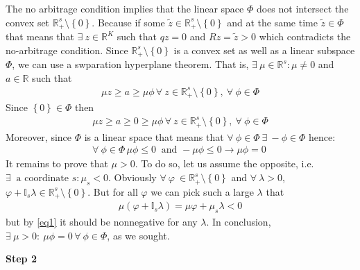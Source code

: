 \documentclass[a4paper]{article}
\begin{document}
The no arbitrage condition implies that the linear space $\Phi$ does not intersect the convex set $\mathbb{R}^s_+\setminus\left\{0\right\}$. Because if some $\tilde{z} \in \mathbb{R}^s_+\setminus\left\{0\right\}$ and at the same time $\tilde{z} \in \Phi$ that means that $\exists\ z\in \mathbb{R}^K$ such that $qz = 0$ and $Rz = \tilde{z} > 0$ which contradicts the no-arbitrage condition. Since $\mathbb{R}^s_+\setminus\left\{0\right\}$ is a convex set as well as a linear subspace $\Phi$, we can use a swparation hyperplane theorem. That is, $\exists\ \mu \in \mathbb{R}^s: \mu \neq 0$ and $a \in \mathbb{R}$ such that
\begin{align*}
\mu z \ge a \ge \mu \phi\, \forall\ z \in \mathbb{R}^s_+\setminus\left\{0\right\},\ \forall\ \phi \in \Phi
\end{align*}
Since $\left\{0\right\} \in \Phi$ then
\begin{align}\label{eq1}
\mu z \ge a \ge 0 \ge \mu \phi\, \forall\ z \in \mathbb{R}^s_+\setminus\left\{0\right\},\ \forall\ \phi \in \Phi
\end{align}
Moreover, since $\Phi$ is a linear space that means that $\forall\ \phi \in \Phi\ \exists\ -\phi \in \Phi$ hence:
\begin{align*}
\forall\ \phi\in\Phi\, \mu \phi \le 0\ \text{ and } -\mu \phi \le 0 \to \mu\phi = 0\
\end{align*}
It remains to prove that $\mu >0$. To do so, let us assume the opposite, i.e. $\exists\ \text{ a coordinate } s: \mu_s < 0$. Obviously $\forall\ \varphi\ \in \mathbb{R}^s_{+}\setminus\left\{0\right\}$ and $\forall\ \lambda > 0$, $\varphi + \mathbb{I}_{s}\lambda \in \mathbb{R}^s_{+}\setminus\left\{0\right\}$. But for all $\varphi$ we can pick such a large $\lambda$ that
\begin{align*}
\mu (\varphi + \mathbb{I}_s\lambda) = \mu \varphi + \mu_s\lambda < 0
\end{align*}
but by \eqref{eq1} it should be nonnegative for any $\lambda$. In conclusion, $\exists\ \mu >0:\ \mu \phi = 0\, \forall\ \phi \in \Phi$, as we sought.

\textbf{Step 2}
\end{document}

